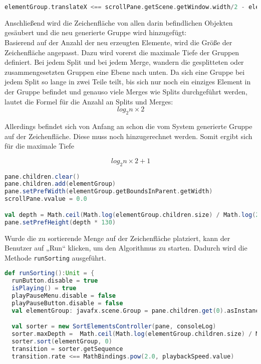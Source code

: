 {\begin{lstlisting}[language=Scala]
    elementGroup.translateX <== scrollPane.getScene.getWindow.width/2 - elementGroup.getBoundsInParent.getWidth/2
\end{lstlisting}

Anschließend wird die Zeichenfläche von allen darin befindlichen Objekten gesäubert und die neu generierte Gruppe wird hinzugefügt:\\
Basierend auf der Anzahl der neu erzeugten Elemente, wird die Größe der Zeichenfläche angepasst. Dazu wird vorerst die maximale Tiefe der Gruppen definiert. Bei jedem Split und bei jedem Merge, wandern die gesplitteten oder zusammengesetzten Gruppen eine Ebene nach unten. Da sich eine Gruppe bei jedem Split so lange in zwei Teile teilt, bis sich nur noch ein einziges Element in der Gruppe befindet und genauso viele Merges wie Splits durchgeführt werden, lautet die Formel für die Anzahl an Splits und Merges:
$$log_2 n \times 2$$

Allerdings befindet sich von Anfang an schon die vom System generierte Gruppe auf der Zeichenfläche. Diese muss noch hinzugerechnet werden. Somit ergibt sich für die maximale Tiefe

$$log_2 n \times 2 + 1$$

\begin{lstlisting}[language=Scala]
pane.children.clear()
pane.children.add(elementGroup)
pane.setPrefWidth(elementGroup.getBoundsInParent.getWidth)
scrollPane.vvalue = 0.0

val depth = Math.ceil(Math.log(elementGroup.children.size) / Math.log(2)) * 2 + 1
pane.setPrefHeight(depth * 130)
\end{lstlisting}

Wurde die zu sortierende Menge auf der Zeichenfläche platziert, kann der Benutzer auf „Run“ klicken, um den Algorithmus zu starten. Dadurch wird die Methode \texttt{runSorting} ausgeführt.

\begin{lstlisting}[language=Scala]
def runSorting():Unit = {
  runButton.disable = true
  isPlaying() = true
  playPauseMenu.disable = false
  playPauseButton.disable = false
  val elementGroup: javafx.scene.Group = pane.children.get(0).asInstanceOf[javafx.scene.Group]

  val sorter = new SortElementsController(pane, consoleLog)
  sorter.maxDepth =  Math.ceil(Math.log(elementGroup.children.size) / Math.log(2)) * 2 + 1
  sorter.sort(elementGroup, 0)
  transition = sorter.getSequence
  transition.rate <== MathBindings.pow(2.0, playbackSpeed.value)


\end{lstlisting}}
